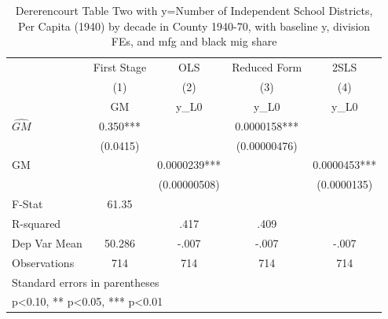 \begin{table}[htbp]\centering
\def\sym#1{\ifmmode^{#1}\else\(^{#1}\)\fi}
\caption{Dererencourt Table Two with y=Number of Independent School Districts, Per Capita (1940) by decade in County 1940-70, with baseline y, division FEs, and mfg and black mig share}
\begin{tabular}{l*{4}{c}}
\toprule
                    & First Stage   &         OLS   &Reduced Form   &        2SLS   \\
                    &\multicolumn{1}{c}{(1)}&\multicolumn{1}{c}{(2)}&\multicolumn{1}{c}{(3)}&\multicolumn{1}{c}{(4)}\\
                    &\multicolumn{1}{c}{GM}&\multicolumn{1}{c}{y\_L0}&\multicolumn{1}{c}{y\_L0}&\multicolumn{1}{c}{y\_L0}\\
\midrule
$\hat{GM}$          &       0.350***&               &   0.0000158***&               \\
                    &    (0.0415)   &               &(0.00000476)   &               \\
\addlinespace
GM                  &               &   0.0000239***&               &   0.0000453***\\
                    &               &(0.00000508)   &               & (0.0000135)   \\
\midrule
F-Stat              &       61.35   &               &               &               \\
R-squared           &               &        .417   &        .409   &               \\
Dep Var Mean        &      50.286   &       -.007   &       -.007   &       -.007   \\
Observations        &         714   &         714   &         714   &         714   \\
\bottomrule
\multicolumn{5}{l}{\footnotesize Standard errors in parentheses}\\
\multicolumn{5}{l}{\footnotesize * p<0.10, ** p<0.05, *** p<0.01}\\
\end{tabular}
\end{table}
